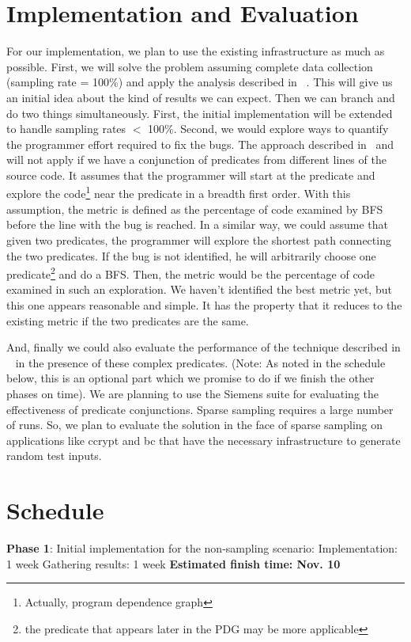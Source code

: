 \section{Implementation and Evaluation}
For our implementation, we plan to use the existing infrastructure as much as possible.  First, we will solve the problem assuming complete data collection (sampling rate = 100\%) and apply the analysis described in ~\cite{Liblit:2005:SSBI}.  This will give us an initial idea about the kind of results we can expect.  Then we can branch and do two things simultaneously.  First, the initial implementation will be extended to handle sampling rates $<$ 100\%.  Second, we would explore ways to quantify the programmer effort required to fix the bugs.  The approach described in~\cite{1062522} and ~\cite{renieris03fault} will not apply if we have a conjunction of predicates from different lines of the source code.  It assumes that the programmer will start at the predicate and explore the code\footnote{Actually, program dependence graph} near the predicate in a breadth first order.  With this assumption, the metric is defined as the percentage of code examined by BFS before the line with the bug is reached.  In a similar way, we could assume that given two predicates, the programmer will explore the shortest path connecting the two predicates.  If the bug is not identified, he will arbitrarily choose one predicate\footnote{the predicate that appears later in the PDG may be more applicable} and do a BFS.  Then, the metric would be the percentage of code examined in such an exploration.  We haven't identified the best metric yet, but this one appears reasonable and simple.  It has the property that it reduces to the existing metric if the two predicates are the same.

And, finally we could also evaluate the performance of the technique described in ~\cite{Zheng:2006:SDSIMB} in the presence of these complex predicates.  (Note: As noted in the schedule below, this is an optional part which we promise to do if we finish the other phases on time).  We are planning to use the Siemens suite for evaluating the effectiveness of predicate conjunctions.  Sparse sampling requires a large number of runs.  So, we plan to evaluate the solution in the face of sparse sampling on applications like ccrypt and bc that have the necessary infrastructure to generate random test inputs.

\section{Schedule}
{\bf Phase 1}: Initial implementation for the non-sampling scenario: \newline
\hspace*{5ex}Implementation: 1 week \newline
\hspace*{5ex}Gathering results: 1 week \newline
{\bf Estimated finish time: Nov. 10}

